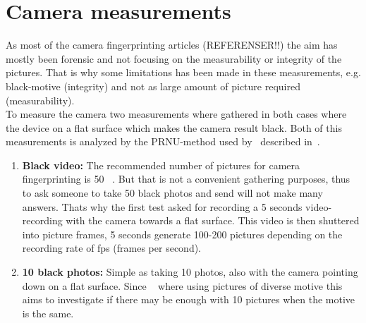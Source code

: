 \section{Camera measurements}\label{sec:measurement:camera}
As most of the camera fingerprinting articles (REFERENSER!!) the aim has mostly been forensic and not focusing on the measurability or integrity of the pictures. That is why some limitations has been made in these measurements, e.g. black-motive (integrity) and not as large amount of picture required (measurability). \\
To measure the camera two measurements where gathered in both cases where the device on a flat surface which makes the camera result black. Both of this measurements is analyzed by the PRNU-method used by~\cite{sensor:camera:DCIdent} described in~.
\begin{enumerate}
  \item \textbf{Black video:} The recommended number of pictures for camera fingerprinting is 50 ~\cite[]{sensor:camera:DCIdent}. But that is not a convenient gathering purposes, thus to ask someone to take 50 black photos and send will not make many answers. Thats why the first test asked for recording a 5 seconds video-recording with the camera towards a flat surface. This video is then shuttered into picture frames, 5 seconds generate 100-200 pictures depending on the recording rate of fps (frames per second).
  \item \textbf{10 black photos:} Simple as taking 10 photos, also with the camera pointing down on a flat surface. Since ~\cite{sensor:camera:DCIdent} where using pictures of diverse motive this aims to investigate if there may be enough with 10 pictures when the motive is the same.
\end{enumerate}

